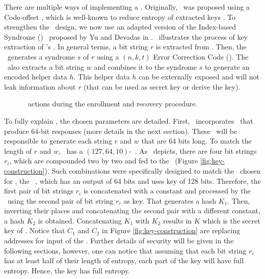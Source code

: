 There are multiple ways of implementing a \fuzzy. Originally, \cshia~was proposed using a Code-offset \fe, which is well-known to reduce entropy of extracted keys \cite{Armknecht2011:Formalization}. To strengthen the \cshia~design, we now use an adapted version of the Index-based Syndrome (\ibs) \fe~proposed by Yu and Devadas in \cite{Yu2010:RobustErrorCorrection}. \fenroll~illustrates the process of key extraction of \cshia's \fe. In general terms, a bit string $r$ is extracted from \pufs. Then, the \fe~generates a syndrome $s$ of $r$ using a $(n,k,t)$ Error Correction Code (\ecc). The \fe~also extracts a bit string $w$ and combines it to the syndrome $s$ to generate an encoded helper data $h$. This helper data $h$ can be externally exposed and will not leak information about $r$ (that can be used as secret key or derive the key).


\begin{figure}[!ht]
	\center
	\caption{\fuzzy~actions during the enrollment and recovery procedure.}
	\label{fig:fuzzy-extractor}
\end{figure}


To fully explain \fenroll, the chosen parameters are detailed. First, \cshia~incorporates \pufs~that produce 64-bit responses (more details in the next section). These \pufs~will be responsible to generate each string $r$ and $w$ that are 64 bits long. To match the length of $r$ and $w$, \cshia~has a $(127, 64, 10)$-\bch~\ecc. As \fenroll~depicts, there are four bit strings $r_i$, which are compounded two by two and fed to the \prf~(Figure \ref{fig:key-construction}). Such combinations were specifically designed to match the \prf~chosen for \cshia, the \siphash~\cite{Aumasson2012:SipHash}, which has an output of 64 bits and uses key of 128 bits. Therefore, the first pair of bit strings $r_i$ is concatenated with a constant and processed by the \prf~using the second pair of bit string $r_i$ as key. That generates a hash $K_1$. Then, inverting their places and concatenating the second pair with a different constant, a hash $K_2$ is obtained. Concatenating $K_1$ with $K_2$ results in $K$ which is the secret key of \cshia. Notice that $C_1$ and $C_2$ in Figure \ref{fig:key-construction} are replacing addresses for input of the \ptaggen. Further details of security will be given in the following sections, however, one can notice that assuming that each bit string $r_i$ has at least half of their length of entropy, each part of the key will have full entropy. Hence, the key has full entropy. 

